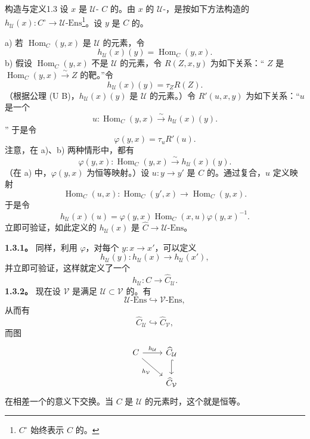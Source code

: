 \begin{SGAresult}{构造与定义}{1.3}
设 $x$ 是 $\mathcal U$- $C$ 的。由 $x$ 的 $\mathcal U$-，是按如下方法构造的 $h_{\mathcal U}(x):C^\circ\to\mathcal U\text{-}\mathrm{Ens}$\footnote[2]{$C^\circ$ 始终表示 $C$ 的。}。设 $y$ 是 $C$ 的。

 a) 若 $\operatorname{Hom}_C(y,x)$ 是 $\mathcal U$ 的元素，令
\[h_{\mathcal U}(x)(y)=\operatorname{Hom}_C(y,x).\]
 b) 假设 $\operatorname{Hom}_C(y,x)$ 不是 $\mathcal U$ 的元素，令 $R(Z,x,y)$ 为如下关系：“ $Z$ 是 $\operatorname{Hom}_C(y,x)\xrightarrow{\sim}Z$ 的靶。”令
\[h_{\mathcal U}(x)(y)=\tau_ZR(Z).\]
（根据公理 (U B)，$h_{\mathcal U}(x)(y)$ 是 $\mathcal U$ 的元素。）令 $R'(u,x,y)$ 为如下关系：“$u$ 是一个
\[u:\operatorname{Hom}_C(y,x)\xrightarrow{\sim}h_{\mathcal U}(x)(y).\]”
于是令
\[\varphi(y,x)=\tau_uR'(u).\]
注意，在 a)、b) 两种情形中，都有
\[\varphi(y,x):\operatorname{Hom}_C(y,x)\xrightarrow{\sim}h_{\mathcal U}(x)(y).\]
（在 a) 中，$\varphi(y,x)$ 为恒等映射。）设 $u:y\to y'$ 是 $C$ 的。通过复合，$u$ 定义映射
\[\operatorname{Hom}_C(u,x):\operatorname{Hom}_C(y',x)\longrightarrow\operatorname{Hom}_C(y,x).\]
于是令
\[h_{\mathcal U}(x)(u)=\varphi(y,x)\operatorname{Hom}_C(x,u)\varphi(y,x)^{-1}.\]
立即可验证，如此定义的 $h_{\mathcal U}(x)$ 是 $\widehat C\to\mathcal U\text{-}\mathrm{Ens}$。
\end{SGAresult}
\textbf{1.3.1。} 同样，利用 $\varphi$，对每个 $y:x\to x'$，可以定义
\[h_{\mathcal U}(y):h_{\mathcal U}(x)\longrightarrow h_{\mathcal U}(x'),\]
并立即可验证，这样就定义了一个
\[h_{\mathcal U}:C\longrightarrow\widehat C_{\mathcal U}.\]
\textbf{1.3.2。} 现在设 $\mathcal V$ 是满足 $\mathcal U\subset\mathcal V$ 的。有
\[\mathcal U\text{-}\mathrm{Ens}\hookrightarrow\mathcal V\text{-}\mathrm{Ens},\]
从而有
\[\widehat C_{\mathcal U}\hookrightarrow\widehat C_{\mathcal V},\]
而图
\[\begin{tikzcd}
 C\arrow[r,"h_{\mathcal U}"]\arrow[dr,"h_{\mathcal V}"']&\widehat C_{\mathcal U}\arrow[d,hook]\\
 &\widehat C_{\mathcal V}
\end{tikzcd}\]
在相差一个的意义下交换。当 $C$ 是 $\mathcal U$ 的元素时，这个就是恒等。

